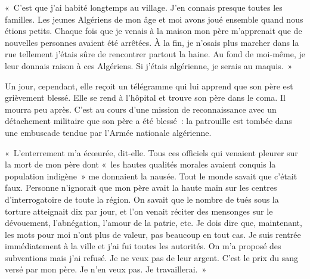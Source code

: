 \documentclass[french,twoside]{book} %
\begin{document}
« C’est que j’ai habité longtemps au village. J’en connais presque toutes les familles. Les jeunes Algériens de mon âge et moi avons joué ensemble quand nous étions petits. Chaque fois que je venais à la maison mon père m’apprenait que de nouvelles personnes avaient été arrêtées. À la fin, je n’osais plus marcher dans la rue tellement j’étais sûre de rencontrer partout la haine. Au fond de moi-même, je leur donnais raison à ces Algériens. Si j’étais algérienne, je serais au maquis. »\par
\bigbreak
\noindent Un jour, cependant, elle reçoit un télégramme qui lui apprend que son père est grièvement blessé. Elle se rend à l’hôpital et trouve son père dans le coma. Il mourra peu après. C’est au cours d’une mission de reconnaissance avec un détachement militaire que son père a été blessé : la patrouille est tombée dans une embuscade tendue par l’Armée nationale algérienne.\par
« L’enterrement m’a écœurée, dit-elle. Tous ces officiels qui venaient pleurer sur la mort de mon père dont « les hautes qualités morales avaient conquis la population indigène » me donnaient la nausée. Tout le monde savait que c’était faux. Personne n’ignorait que mon père avait la haute main sur les centres d’interrogatoire de toute la région. On savait que le nombre de tués sous la torture atteignait dix par jour, et l’on venait réciter des mensonges sur le dévouement, l’abnégation, l’amour de la patrie, etc. Je dois dire que, maintenant, les mots pour moi n’ont plus de valeur, pas beaucoup en tout cas. Je suis rentrée immédiatement à la ville et j’ai fui toutes les autorités. On m’a proposé des subventions mais j’ai refusé. Je ne veux pas de leur   argent. C’est le prix du sang versé par mon père. Je n’en veux pas. Je travaillerai. »
\end{document}
